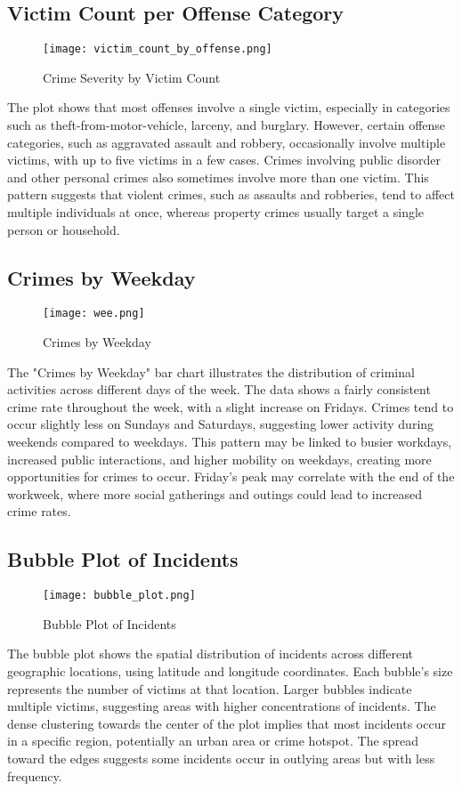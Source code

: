 \documentclass{article}
\begin{document}
\subsection{Victim Count per Offense Category}
\begin{figure}[H]
    \centering
    \texttt{[image: victim\_count\_by\_offense.png]}
    \caption{Crime Severity by Victim Count}
    \label{fig:victim_count_by_offense}
\end{figure}
The plot shows that most offenses involve a single victim, especially in categories such as theft-from-motor-vehicle, larceny, and burglary. However, certain offense categories, such as aggravated assault and robbery, occasionally involve multiple victims, with up to five victims in a few cases. Crimes involving public disorder and other personal crimes also sometimes involve more than one victim. This pattern suggests that violent crimes, such as assaults and robberies, tend to affect multiple individuals at once, whereas property crimes usually target a single person or household.

\subsection{Crimes by Weekday}
\begin{figure}[H]
    \centering
    \texttt{[image: wee.png]}
    \caption{Crimes by Weekday}
    \label{fig:crimes_by_weekday}
\end{figure}
The "Crimes by Weekday" bar chart illustrates the distribution of criminal activities across different days of the week. The data shows a fairly consistent crime rate throughout the week, with a slight increase on Fridays. Crimes tend to occur slightly less on Sundays and Saturdays, suggesting lower activity during weekends compared to weekdays. This pattern may be linked to busier workdays, increased public interactions, and higher mobility on weekdays, creating more opportunities for crimes to occur. Friday's peak may correlate with the end of the workweek, where more social gatherings and outings could lead to increased crime rates.


\subsection{Bubble Plot of Incidents}
\begin{figure}[H]
    \centering
    \texttt{[image: bubble\_plot.png]}
    \caption{Bubble Plot of Incidents}
    \label{fig:bubble_plot}
\end{figure}
The bubble plot shows the spatial distribution of incidents across different geographic locations, using latitude and longitude coordinates. Each bubble’s size represents the number of victims at that location. Larger bubbles indicate multiple victims, suggesting areas with higher concentrations of incidents. The dense clustering towards the center of the plot implies that most incidents occur in a specific region, potentially an urban area or crime hotspot. The spread toward the edges suggests some incidents occur in outlying areas but with less frequency. 
\end{document}
